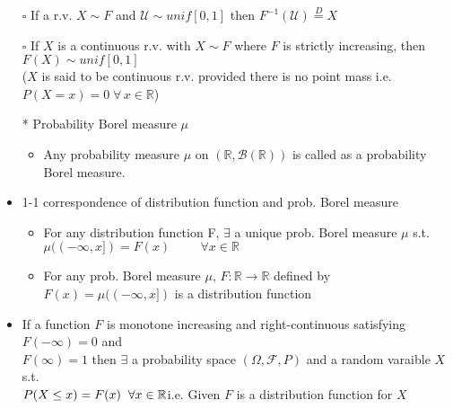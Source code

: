 \documentclass[12pt, A4]{article}
\begin{document}
\begin{itemize}
\begin{enumerate}
	\end{enumerate} 
	\item[$\square$] If a r.v. $X\sim F$ and $\mathcal{U}\sim unif[0,1]$ then $F^{-1}(\mathcal{U})\overset{D}{=}X$
	\item[$\square$] If $X$ is a continuous r.v. with $X\sim F$ where $F$ is strictly increasing, then $F(X)\sim unif[0,1]$ \\ ($X$ is said to be continuous r.v. provided there is no point mass i.e. $P(X=x)=0 \; \forall \, x\in \mathbb{R}$)  
	\item[*] Probability Borel measure $\mu$
	\begin{itemize}
		\item Any probability measure $\mu$ on $(\mathbb{R}, \mathcal{B}(\mathbb{R}))$ is called as a probability Borel measure.
	\end{itemize}
	\item 1-1 correspondence of distribution function and prob. Borel measure
	\begin{itemize}
		\item For any distribution function F, \hspace{0.3cm} $\exists$ a unique prob. Borel measure $\mu$ s.t.\\ $\mu((-\infty, x])=F(x) \hspace{1cm} \forall x\in \mathbb{R}$
		\item For any prob. Borel measure $\mu$, \hspace{0.3cm} $F:\mathbb{R}\rightarrow \mathbb{R}$ defined by \newline $F(x)=\mu((-\infty, x])$ is a distribution function
	\end{itemize}
	\item If a function $F$ is monotone increasing and right-continuous satisfying $F(-\infty)=0$ and\\ $F(\infty)=1$ then $\exists$ a probability space $(\Omega, \mathcal{F}, P)$ and a random varaible $X$ s.t. \\ $P(X\leq x)=F(x) \hspace{0.2cm} \forall x\in \mathbb{R} $\quad i.e. Given $F$ is a distribution function for $X$ 
\end{itemize}
\clearpage
\end{document}
